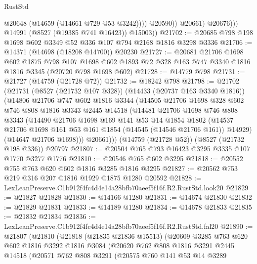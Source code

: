 \begin{lexlean}{RustStd}
\begin{coremodule}
                        @20648
                        (@14659 (@14661 @729 @53 @3242))))
                    @20590))
                @20661)
              @20676)))
        @14991
        (@8527 (@19385 @741 @16423))
        @15003))
@21702 := @20685 @798 @198 @1698 @602 @3349 @52 @336 @107 @794 @2168 @1816 @3298 @3336
@21706 := @14371 (@14698 (@18208 @14700)) @20230
@21727 := @20681
    @21706
    @1698
    @602
    @1875
    @798
    @107
    @1698
    @602
    @1893
    @72
    @328
    @163
    @747
    @3340
    @1816
    @1816
    @3345
    (@20720 @798 @1698 @602)
@21728 := @14779 @798
@21731 := @21727 (@14759 (@21728 @72))
@21732 := @18242 @798
@21798 := @21702
    (@21731
      (@8527 (@21732 @107 @328))
      (@14433 (@20737 @163 @3340 @1816))
      (@14806
        @21706
        @747
        @602
        @1816
        @3344
        (@14505
          @21706
          @1698
          @328
          @602
          @746
          @808
          @1816
          @3343
          @2445
          @14518
          (@14481
            @21706
            @1698
            @746
            @808
            @3343
            (@14490
              @21706
              @1698
              @169
              @141
              @53
              @14
              @1854
              @1802
              (@14537 @21706 @1698 @161 @53 @161 @1854 (@14545 (@14546 @21706 @161)) @14929)
              (@14647 @21706 @1698)))
          @20661)))
    (@14759 (@21728 @52))
    (@8527 (@21732 @198 @336))
    @20797
@21807 := @20504 @765 @793 @16423 @3295 @3335 @107 @1770 @3277 @1776
@21810 := @20546 @765 @602 @3295
@21818 := @20552 @755 @763 @620 @602 @1816 @3285 @1816 @3295
@21827 := @20562 @753 @219 @316 @207 @1816 @1929 @1875 @1280 @20592
@21828 := LexLeanPreserve.C1b912f4fc4d4e14a28bfb70aeef5f16f.R2.RustStd.look20
@21829 := @21827 @21828
@21830 := @14166 @1280
@21831 := @14674 @21830
@21832 := @21829 @21831
@21833 := @14189 @1280
@21834 := @14678 @21833
@21835 := @21832 @21834
@21836 := LexLeanPreserve.C1b912f4fc4d4e14a28bfb70aeef5f16f.R2.RustStd.fal20
@21890 := @21807
    (@21810
      (@21818
        (@21835 @21836 @15513)
        (@20609
          @3285
          @763
          @620
          @602
          @1816
          @3292
          @1816
          @3084
          (@20620
            @762
            @808
            @1816
            @3291
            @2445
            @14518
            (@20571
              @762
              @808
              @3291
              (@20575
                @760
                @141
                @53
                @14
                @3289

\end{coremodule}
\end{lexlean}
